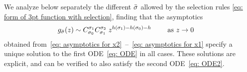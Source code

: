 \documentclass[oneside,english]{amsart}
\numberwithin{equation}{section}
\numberwithin{figure}{section}
\theoremstyle{plain}
\theoremstyle{plain}
\theoremstyle{plain}
\theoremstyle{remark}
\theoremstyle{plain}
\theoremstyle{plain}
\theoremstyle{plain}
\theoremstyle{plain}
\theoremstyle{plain}
\theoremstyle{plain}
\theoremstyle{plain}
\theoremstyle{plain}
\newcommand{\red}[1]{{\color{red} #1}}
\begin{document}
We analyze below separately the different $\bar{\sigma}$ allowed by the selection rules \eqref{eq: form of 3pt function with selection}, finding that the asymptotics
\begin{align} \label{eq: required asymptotics for the ODE for 4pt conformal block}
g_{\bar{\sigma}}(z)\sim\; & C_{\sigma_{0}}^{\sigma_{1}}C_{\sigma_{1}}^{\sigma_{2}}\;z^{h(\sigma_{1})-h(\sigma_{0})-h} \qquad \text{ as } z \to 0 
\end{align}
obtained from~\eqref{eq: asymptotics for x2}~--~\eqref{eq: asymptotics for x1} specify a unique solution to the first ODE~\eqref{eq: ODE} in all cases. These solutions are explicit, and can be verified to also satisfy the second ODE~\eqref{eq: ODE2}.


\end{document}
